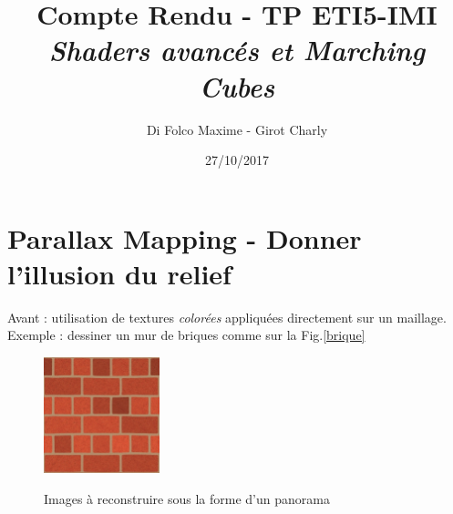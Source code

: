 \documentclass[a4paper]{article}
\title{Compte Rendu - TP ETI5-IMI \\ \textit{Shaders avancés et Marching Cubes}}
\author{Di Folco Maxime - Girot Charly}
\date{27/10/2017}
\begin{document}
\maketitle

\section{Parallax Mapping - Donner l'illusion du relief}

Avant : utilisation de textures \textit{colorées} appliquées directement sur un maillage. Exemple : dessiner un mur de briques comme sur la Fig.\ref{brique}

\begin{figure}[H]
\centering
\includegraphics[width=0.3\textwidth]{figures/brick_diffuse.png}\label{briques}
\caption{Images à reconstruire sous la forme d'un panorama}
\end{figure}







\end{document}
